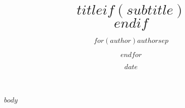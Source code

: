 \documentclass[12pt]{report}
\title{$title$$if(subtitle)$\\\vspace{0.5em}{\large $subtitle$}$endif$}
\author{$for(author)$$author$$sep$ \and $endfor$}
\date{$date$}
\begin{document}
\maketitle
\tableofcontents
$body$
\end{document}
